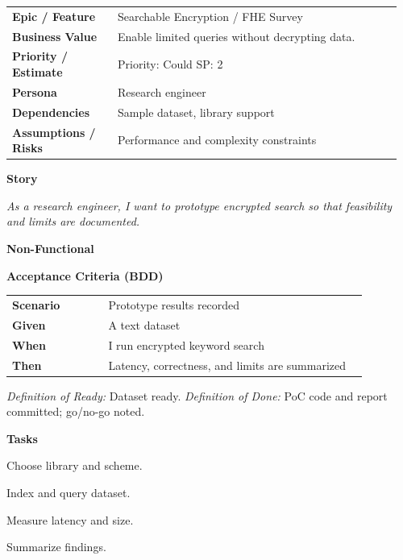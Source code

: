 \documentclass[11pt,letterpaper]{article}
\makeatletter
\newenvironment{kvtable}{%
  \par\noindent\begin{tabular}{@{}>{\raggedright\bfseries\arraybackslash}p{0.26\linewidth} >{\raggedright\arraybackslash}p{0.70\linewidth}@{}}
}{\end{tabular}\par}
\newenvironment{bdd}{%
  \par\noindent\begin{tabular}{@{}>{\raggedright\bfseries\arraybackslash}p{0.26\linewidth} >{\raggedright\arraybackslash}p{0.70\linewidth}@{}}
}{\end{tabular}\par}
\newcommand{\DoRDoD}[2]{%
  \vspace{0.35em}
  {\footnotesize\color{Muted}%
    \textit{Definition of Ready:} #1 \; \textbullet\;
    \textit{Definition of Done:} #2%
  }%
}
\newenvironment{storycard}[2]{%
  \begin{tcolorbox}[cloudcard, title={#1 --- #2}]%
}{\end{tcolorbox}}
\newcommand{\sectionlabel}[1]{\par\vspace{0.35em}\textbf{#1}\par}
\makeatother
\begin{document}
\begin{storycard}{CCS-23}{Ch. 23 — Computation Over Encrypted Data}
\begin{kvtable}
Epic / Feature & Searchable Encryption / FHE Survey\\
Business Value & Enable limited queries without decrypting data.\\
Priority / Estimate & Priority: Could \quad SP: 2\\
Persona & Research engineer\\
Dependencies & Sample dataset, library support\\
Assumptions / Risks & Performance and complexity constraints\\
\end{kvtable}
\sectionlabel{Story}
\textit{As a research engineer, I want to prototype encrypted search so that feasibility and limits are documented.}
\sectionlabel{Non-Functional}\;
\sectionlabel{Acceptance Criteria (BDD)}
\begin{bdd}
Scenario & Prototype results recorded\\
Given & A text dataset\\
When & I run encrypted keyword search\\
Then & Latency, correctness, and limits are summarized\\
\end{bdd}
\DoRDoD{Dataset ready.}{PoC code and report committed; go/no-go noted.}
\sectionlabel{Tasks}
\begin{checklist}
\item Choose library and scheme.
\item Index and query dataset.
\item Measure latency and size.
\item Summarize findings.
\end{checklist}
\end{storycard}
\end{document}
